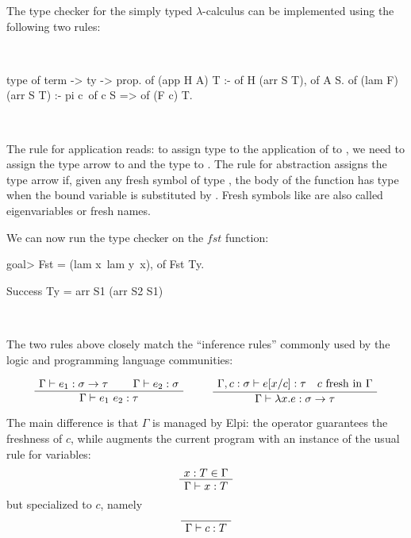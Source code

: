 \documentclass[a4paper, 11pt]{book}
\newenvironment{bprooftree}
  {\leavevmode\hbox\bgroup}
  {\DisplayProof\egroup}
\newenvironment{elpicode}
  {\VerbatimEnvironment~\\\begin{elpibox}\begin{xelpicode}}{\end{xelpicode}
\end{elpibox}\\}
\begin{document}


The type checker for the simply typed $\lambda$-calculus can be implemented
using the following two rules:

\begin{elpicode}
type of term -> ty -> prop.
of (app H A) T :- of H (arr S T), of A S.
of (lam F) (arr S T) :- pi c\ of c S => of (F c) T.
\end{elpicode}

The rule for application reads: to assign type  to the application of
 to , we need to assign the type  arrow  to
 and the type  to . The rule for abstraction assigns
the type  arrow  if, given any fresh symbol  of type
, the body of the function  has type  when the bound
variable is substituted by .
Fresh symbols like  are also called eigenvariables or fresh names.

We can now run the type checker on the $fst$ function:
\begin{elpicode}
goal> Fst = (lam x\ lam y\ x), of Fst Ty.

Success
  Ty = arr S1 (arr S2 S1)
\end{elpicode}

The two rules above closely match the ``inference rules'' commonly used by the
logic and programming language communities:
\label{inf:stlc}

$$
\begin{bprooftree}
  \AxiomC{$\Gamma \vdash e_1 : \sigma \to \tau$}
  \AxiomC{$\Gamma \vdash e_2 : \sigma$}
  \BinaryInfC{$\Gamma \vdash e_1~e_2 : \tau$}
\end{bprooftree}
\qquad
\begin{bprooftree}
  \AxiomC{$\Gamma, c : \sigma \vdash e[x/c] : \tau \quad c~\mathrm{fresh~in}~\Gamma$}
  \UnaryInfC{$\Gamma \vdash \lambda x.e : \sigma \to \tau$}
\end{bprooftree}
$$



The main difference is that $\Gamma$ is managed by Elpi: the 
operator guarantees the freshness of $c$, while \elpi{=>} augments the
current program with an instance of the usual rule for variables:
$$
\begin{bprooftree}
  \AxiomC{$x : T \in \Gamma$}
  \UnaryInfC{$\Gamma \vdash x : T$}
\end{bprooftree}
$$
\noindent but specialized to $c$, namely
$$
\begin{bprooftree}
  \AxiomC{}
  \UnaryInfC{$\Gamma \vdash c : T$}
\end{bprooftree}
$$
\end{document}
